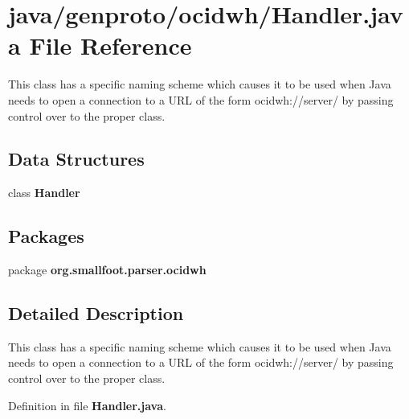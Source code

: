 \section{java/genproto/ocidwh/\+Handler.java File Reference}
\label{genproto_2ocidwh_2Handler_8java}


This class has a specific naming scheme which causes it to be used when Java needs to open a connection to a U\+R\+L of the form ocidwh\+://server/ by passing control over to the proper class.  


\subsection*{Data Structures}
\begin{DoxyCompactItemize}
\item 
class {\bf Handler}
\end{DoxyCompactItemize}
\subsection*{Packages}
\begin{DoxyCompactItemize}
\item 
package {\bf org.\+smallfoot.\+parser.\+ocidwh}
\end{DoxyCompactItemize}


\subsection{Detailed Description}
This class has a specific naming scheme which causes it to be used when Java needs to open a connection to a U\+R\+L of the form ocidwh\+://server/ by passing control over to the proper class. 



Definition in file {\bf Handler.\+java}.

